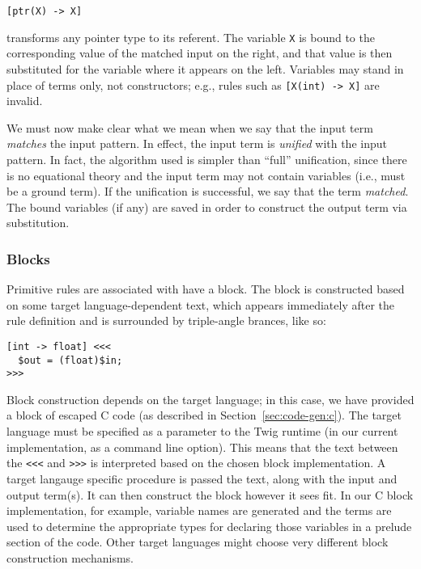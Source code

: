 \begin{verbatim}
[ptr(X) -> X]
\end{verbatim}

transforms any pointer type to its referent. The variable \texttt{X} is bound to the corresponding value of the matched input on the right, and that value is then substituted for the variable where it appears on the left. Variables may stand in place of terms only, not constructors; e.g., rules such as \texttt{[X(int) -> X]} are invalid.

We must now make clear what we mean when we say that the input term \emph{matches} the input pattern. In effect, the input term is \emph{unified}\cite{baader98rewriting} with the input pattern. In fact, the algorithm used is simpler than ``full'' unification, since there is no equational theory and the input term may not contain variables (i.e., must be a ground term). If the unification is successful, we say that the term \emph{matched}. The bound variables (if any) are saved in order to construct the output term via substitution.


\subsubsection{Blocks}

Primitive rules are associated with have a block. The block is constructed based on some target language-dependent text, which appears immediately after the rule definition and is surrounded by triple-angle brances, like so:

\begin{verbatim}
[int -> float] <<<
  $out = (float)$in;
>>>
\end{verbatim}

Block construction depends on the target language; in this case, we have provided a block of escaped C code (as described in Section~\ref{sec:code-gen:c}). The target language must be specified as a parameter to the Twig runtime (in our current implementation, as a command line option). This means that the text between the \verb|<<<| and \verb|>>>| is interpreted based on the chosen block implementation. A target langauge specific procedure is passed the text, along with the input and output term(s). It can then construct the block however it sees fit. In our C block implementation, for example, variable names are generated and the terms are used to determine the appropriate types for declaring those variables in a prelude section of the code. Other target languages might choose very different block construction mechanisms.

